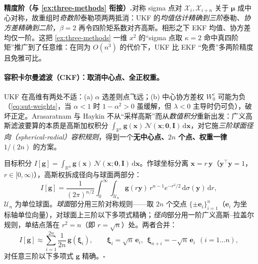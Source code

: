 \begin{note}
\textbf{精度阶（与 \cref{ex:three-methods} 衔接）.}\;对称 sigma 点对 $\boldsymbol{\mathcal{X}}_i,\boldsymbol{\mathcal{X}}_{i+n}$ 关于 $\boldsymbol{\mu}$ 成中心对称，故重组时\emph{奇数阶}泰勒项两两抵消：UKF 的\emph{均值估计精确到三阶}泰勒、\emph{协方差精确到二阶}，$\beta=2$ 再令四阶矩系数对齐高斯。相形之下 EKF 均值、协方差均仅一阶。这把 \cref{ex:three-methods} 一维 $x^2$ 的“sigma 点取 $\kappa=2$ 命中真四阶矩”推广到了任意维：在同为 $O(n^3)$ 的代价下，UKF 比 EKF “免费”多两阶精度且免雅可比\cite{barfoot2024state,julier2002scaled}。
\end{note}

\paragraph{容积卡尔曼滤波（CKF）：取消中心点、全正权重。}
UKF 在高维有两处不适\cite{arasaratnam2009cubature}：(a) $\alpha$ 选差则点飞远；(b) 中心协方差权 $W_0^c$ 可能为负（\cref{eq:sut-weights}，当 $\alpha<1$ 时 $1-\alpha^2>0$ 虽缓解，但 $\lambda<0$ 主导时仍可负），破坏正定。Arasaratnam 与 Haykin\cite{arasaratnam2009cubature} 不从“采样高斯”而从\emph{数值积分}重新出发：广义高斯滤波要算的本质是高斯加权积分 $\int_{\mathbb{R}^n}\mathbf{g}(\mathbf{x})\,\mathcal{N}(\mathbf{x};\boldsymbol{0},\mathbf{I})\,\mathrm{d}\mathbf{x}$，对它施\emph{三阶球面径向（spherical-radial）容积规则}，得到一个\textbf{无中心点、$2n$ 个点、权重一律 $1/(2n)$} 的方案。

\begin{derivation}[三阶球面径向容积规则]\label{der:ckf-rule}
目标积分 $I[\mathbf{g}]=\int_{\mathbb{R}^n}\mathbf{g}(\mathbf{x})\,\mathcal{N}(\mathbf{x};\boldsymbol{0},\mathbf{I})\,\mathrm{d}\mathbf{x}$。作球坐标分离 $\mathbf{x}=r\,\mathbf{y}$（$\mathbf{y}^\top\mathbf{y}=1$，$r\in[0,\infty)$），高斯权拆成径向与球面两部分\cite{arasaratnam2009cubature}：
\[
  I[\mathbf{g}]=\frac{1}{(2\pi)^{n/2}}\int_0^\infty\!\!\int_{\mathcal{U}_n}\mathbf{g}(r\mathbf{y})\,r^{n-1}e^{-r^2/2}\,\mathrm{d}\sigma(\mathbf{y})\,\mathrm{d}r,
\]
$\mathcal{U}_n$ 为单位球面。\emph{球面}部分用三阶对称规则——取 $2n$ 个交点 $\{\pm\mathbf{e}_i\}_{i=1}^n$（$\mathbf{e}_i$ 为坐标轴单位向量），对球面上三阶以下多项式精确；\emph{径向}部分用一阶广义高斯--拉盖尔规则，单结点落在 $r^2=n$（即 $r=\sqrt{n}$）处。两者合并：
\begin{equation}
  I[\mathbf{g}]\approx\sum_{i=1}^{2n}\frac{1}{2n}\,\mathbf{g}(\boldsymbol{\xi}_i),\qquad
  \boldsymbol{\xi}_i=\sqrt{n}\,\mathbf{e}_i,\ \ \boldsymbol{\xi}_{n+i}=-\sqrt{n}\,\mathbf{e}_i\ \ (i=1\dots n),
  \label{eq:ckf-points}
\end{equation}
对任意三阶以下多项式 $\mathbf{g}$ 精确。\hfill$\square$
\end{derivation}


